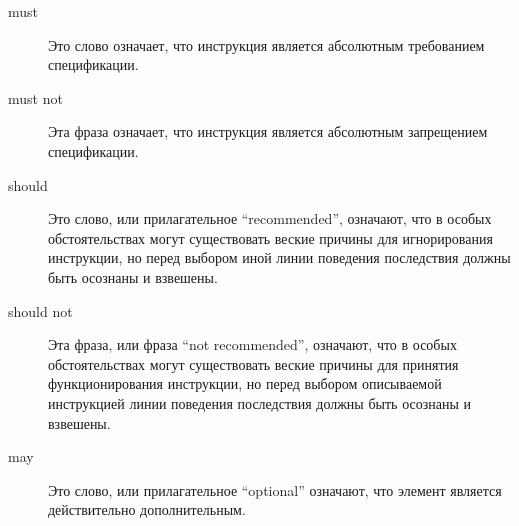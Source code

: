 \begin{description}
\item[must] Это слово означает, что инструкция является абсолютным требованием
  спецификации.
\item[must not] Эта фраза означает, что инструкция является абсолютным запрещением
  спецификации.
\item[should] Это слово, или прилагательное ``recommended'', означают, что
  в особых обстоятельствах могут существовать веские причины для игнорирования инструкции, но перед
  выбором иной линии поведения последствия должны быть осознаны и взвешены.
\item[should not] Эта фраза, или фраза ``not recommended'', означают, что
  в особых обстоятельствах могут существовать веские причины для принятия функционирования
  инструкции, но перед выбором описываемой инструкцией линии поведения последствия
  должны быть осознаны и взвешены.
\item[may] Это слово, или прилагательное ``optional'' означают, что
  элемент является действительно дополнительным.
\end{description}\vspace{1mm}

